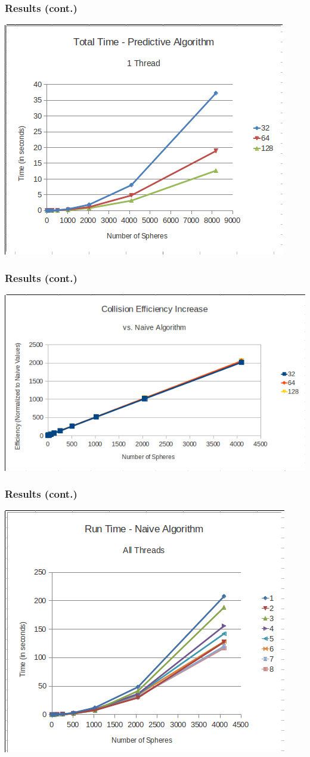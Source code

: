 \documentclass{beamer}
\begin{document}
\begin{frame}
	\frametitle{Results (cont.)}
	\begin{center}
		\includegraphics[width=.75\textwidth]{runtime_predictive_1thread.png}
	\end{center}
\end{frame}

\begin{frame}
	\frametitle{Results (cont.)}
	\begin{center}
		\includegraphics[width=.75\textwidth]{collision_efficiency.png}
	\end{center}
\end{frame}

\begin{frame}
	\frametitle{Results (cont.)}
	\begin{center}
		\includegraphics[width=.75\textwidth]{runtime_naive_allthreads.png}
	\end{center}
\end{frame}
\end{document}
